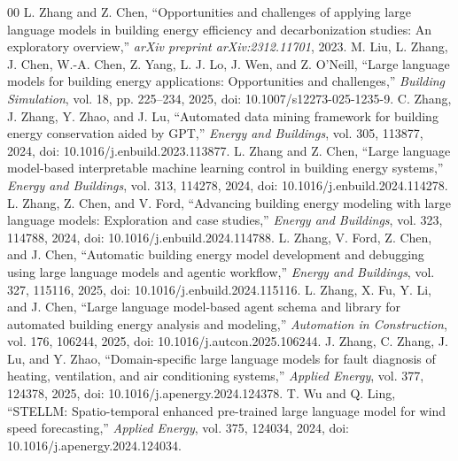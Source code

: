 \documentclass{ieeeaccess}
\begin{document}
\begin{thebibliography}{00}
 L. Zhang and Z. Chen, ``Opportunities and challenges of applying large language models in building energy efficiency and decarbonization studies: An exploratory overview,'' \emph{arXiv preprint arXiv:2312.11701}, 2023.
 M. Liu, L. Zhang, J. Chen, W.-A. Chen, Z. Yang, L. J. Lo, J. Wen, and Z. O'Neill, ``Large language models for building energy applications: Opportunities and challenges,'' \emph{Building Simulation}, vol. 18, pp. 225--234, 2025, doi: 10.1007/s12273-025-1235-9.
 C. Zhang, J. Zhang, Y. Zhao, and J. Lu, ``Automated data mining framework for building energy conservation aided by GPT,'' \emph{Energy and Buildings}, vol. 305, 113877, 2024, doi: 10.1016/j.enbuild.2023.113877.
 L. Zhang and Z. Chen, ``Large language model-based interpretable machine learning control in building energy systems,'' \emph{Energy and Buildings}, vol. 313, 114278, 2024, doi: 10.1016/j.enbuild.2024.114278.
 L. Zhang, Z. Chen, and V. Ford, ``Advancing building energy modeling with large language models: Exploration and case studies,'' \emph{Energy and Buildings}, vol. 323, 114788, 2024, doi: 10.1016/j.enbuild.2024.114788.
 L. Zhang, V. Ford, Z. Chen, and J. Chen, ``Automatic building energy model development and debugging using large language models and agentic workflow,'' \emph{Energy and Buildings}, vol. 327, 115116, 2025, doi: 10.1016/j.enbuild.2024.115116.
 L. Zhang, X. Fu, Y. Li, and J. Chen, ``Large language model-based agent schema and library for automated building energy analysis and modeling,'' \emph{Automation in Construction}, vol. 176, 106244, 2025, doi: 10.1016/j.autcon.2025.106244.
 J. Zhang, C. Zhang, J. Lu, and Y. Zhao, ``Domain-specific large language models for fault diagnosis of heating, ventilation, and air conditioning systems,'' \emph{Applied Energy}, vol. 377, 124378, 2025, doi: 10.1016/j.apenergy.2024.124378.
 T. Wu and Q. Ling, ``STELLM: Spatio-temporal enhanced pre-trained large language model for wind speed forecasting,'' \emph{Applied Energy}, vol. 375, 124034, 2024, doi: 10.1016/j.apenergy.2024.124034.
\end{thebibliography}
\end{document}
